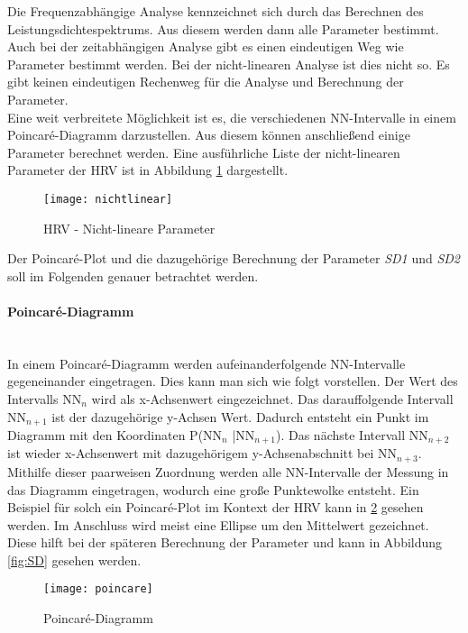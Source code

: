Die Frequenzabhängige Analyse kennzeichnet sich durch das Berechnen des Leistungsdichtespektrums. Aus diesem werden dann alle Parameter bestimmt. Auch bei der zeitabhängigen Analyse gibt es einen eindeutigen Weg wie Parameter bestimmt werden. Bei der nicht-linearen Analyse ist dies nicht so. Es gibt keinen eindeutigen \glqq Rechenweg\grqq{} für die Analyse und Berechnung der Parameter. \\ 
Eine  weit verbreitete Möglichkeit ist es, die verschiedenen NN-Intervalle in einem Poincaré-Diagramm darzustellen. Aus diesem können anschließend einige Parameter berechnet werden. Eine ausführliche Liste der nicht-linearen Parameter der \acs{HRV} ist in Abbildung  \ref{fig:nichtlinear} dargestellt.\cite{poincare}
\begin{figure}[H]
	\centering
	\texttt{[image: nichtlinear]}
	\caption{HRV - Nicht-lineare Parameter}
	\label{fig:nichtlinear}
	\cite[S.3]{med}
\end{figure}

Der Poincaré-Plot und die dazugehörige Berechnung der Parameter \textit{SD1} und \textit{SD2} soll im Folgenden genauer betrachtet werden.

\paragraph{Poincaré-Diagramm}\mbox{} \\
In einem Poincaré-Diagramm werden aufeinanderfolgende NN-Intervalle gegeneinander eingetragen. Dies kann man sich wie folgt vorstellen.
Der Wert des Intervalls NN$_{n}$  wird als x-Achsenwert eingezeichnet. Das darauffolgende Intervall NN$_{n+1}$ ist der dazugehörige y-Achsen Wert. Dadurch entsteht ein Punkt im Diagramm mit den Koordinaten P(NN$_{n}$ |NN$_{n+1}$). Das nächste Intervall NN$_{n+2}$ ist wieder x-Achsenwert mit dazugehörigem y-Achsenabschnitt bei NN$_{n+3}$. Mithilfe dieser paarweisen Zuordnung werden alle NN-Intervalle der Messung in das Diagramm eingetragen, wodurch eine große Punktewolke entsteht. Ein Beispiel für solch ein  Poincaré-Plot im Kontext der \acs{HRV} kann in \ref{fig:poincare} gesehen werden. Im Anschluss wird meist eine Ellipse um den Mittelwert gezeichnet. Diese hilft bei der späteren Berechnung der Parameter und kann in Abbildung \ref{fig:SD} gesehen werden.\cite{poincare}

\begin{figure}[H]
	\centering
	\texttt{[image: poincare]}
	\caption{Poincaré-Diagramm}
	\label{fig:poincare}
	\cite{poincare}
\end{figure}

